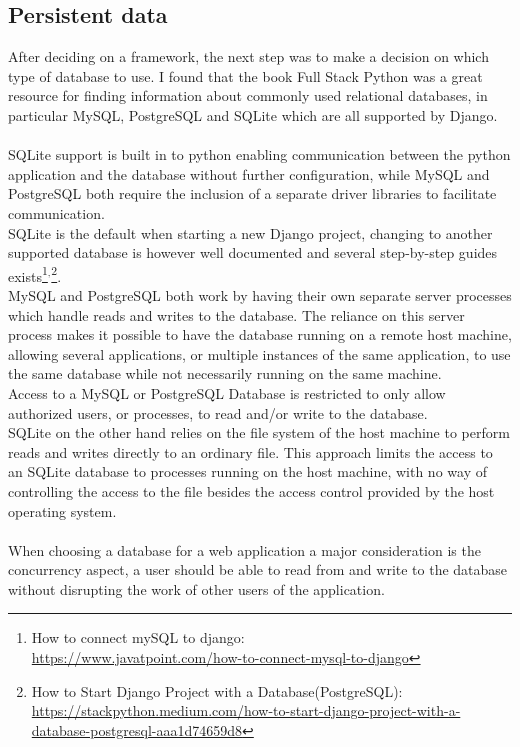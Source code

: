 \subsection{Persistent data}
After deciding on a framework, the next step was to make a decision on which type of database to use. I found that the book Full Stack Python \cite{which_db} was a great resource for finding information about commonly used relational databases, in particular MySQL, PostgreSQL and SQLite which are all supported by Django.\\\\
SQLite support is built in to python \cite{python_sqlite} enabling communication between the python application and the database without further configuration, while MySQL and PostgreSQL both require the inclusion of a separate driver libraries to facilitate communication.\\
SQLite is the default when starting a new Django project, changing to another supported database is however well documented and several step-by-step guides exists\footnote{How to connect mySQL to django: \\\tiny\url{https://www.javatpoint.com/how-to-connect-mysql-to-django}}$^{,}$\footnote{How to Start Django Project with a Database(PostgreSQL):\\\tiny\url{https://stackpython.medium.com/how-to-start-django-project-with-a-database-postgresql-aaa1d74659d8}}.\\
MySQL and PostgreSQL both work by having their own separate server processes which handle reads and writes to the database. The reliance on this server process makes it possible to have the database running on a remote host machine, allowing several applications, or multiple instances of the same application, to use the same database while not necessarily running on the same machine.\\
Access to a MySQL or PostgreSQL Database is restricted to only allow authorized users, or processes, to read and/or write to the database.\\
SQLite on the other hand relies on the file system of the host machine to perform reads and writes directly to an ordinary file. This approach limits the access to an SQLite database to processes running on the host machine, with no way of controlling the access to the file besides the access control provided by the host operating system.\\\\
When choosing a database for a web application a major consideration is the concurrency aspect, a user should be able to read from and write to the database without disrupting the work of other users of the application.\\
